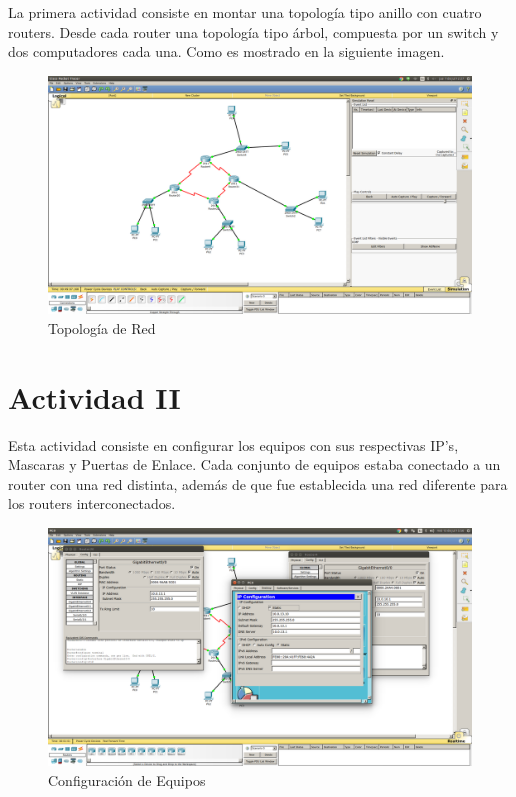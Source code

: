 ﻿\documentclass[spanish]{udpreport}
\begin{document}
La primera actividad consiste en montar una topología tipo anillo con cuatro routers. Desde cada router una topología tipo árbol, compuesta por un switch y dos computadores cada una. Como es mostrado en la siguiente imagen.

\begin{figure}[H]
	\centering
	\includegraphics[scale=.25]{imagenes/red.png}
	\caption{Topología de Red}
	\label{fig:Figura 2.1}
\end{figure}

\section{Actividad II}

Esta actividad consiste en configurar los equipos con sus respectivas IP's, Mascaras y Puertas de Enlace. Cada conjunto de equipos estaba conectado a un router con una red distinta, además de que fue establecida una red diferente para los routers interconectados.

\begin{figure}[H]
	\centering
	\includegraphics[scale=.25]{imagenes/ips.png}
	\caption{Configuración de Equipos}
	\label{fig:Figura 3.1}
\end{figure}
\end{document}
